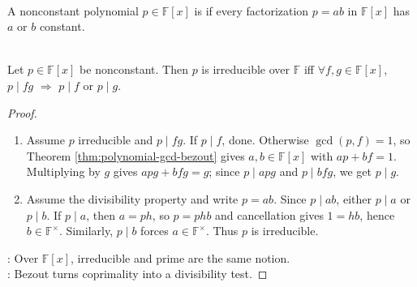 \begin{definition} \label{def:irreducible-polynomial} \\
A nonconstant polynomial $p\in\mathbb{F}[x]$ is  if every factorization $p=ab$ in $\mathbb{F}[x]$ has $a$ or $b$ constant.
\end{definition}

\begin{proposition} \label{prop:irreducible-polynomial-prime-property} \\
Let $p\in\mathbb{F}[x]$ be nonconstant. Then $p$ is irreducible over $\mathbb{F}$ iff $\forall f,g\in\mathbb{F}[x]$, $p\mid fg$ $\Longrightarrow$ $p\mid f$ or $p\mid g$.
\begin{proof}
\begin{enumerate}[label=\roman*.]
\setlength{\itemsep}{0pt}
\item[$(\Rightarrow)$] Assume $p$ irreducible and $p\mid fg$. If $p\mid f$, done. Otherwise $\gcd(p,f)=1$, so Theorem \ref{thm:polynomial-gcd-bezout} gives $a,b\in\mathbb{F}[x]$ with $ap+bf=1$. Multiplying by $g$ gives $apg+bfg=g$; since $p\mid apg$ and $p\mid bfg$, we get $p\mid g$.
\item[$(\Leftarrow)$] Assume the divisibility property and write $p=ab$. Since $p\mid ab$, either $p\mid a$ or $p\mid b$. If $p\mid a$, then $a=ph$, so $p=phb$ and cancellation gives $1=hb$, hence $b\in\mathbb{F}^{\times}$. Similarly, $p\mid b$ forces $a\in\mathbb{F}^{\times}$. Thus $p$ is irreducible.
\end{enumerate}
: Over $\mathbb{F}[x]$, irreducible and prime are the same notion.\\
: Bezout turns coprimality into a divisibility test.
\end{proof}
\end{proposition}

